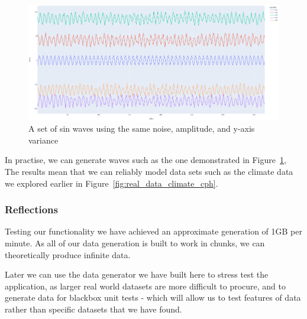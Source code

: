 \begin{figure}[H]
    \centering
    \includegraphics[width=12cm]{figures/data_generation/fake_data_sin_waves}
    \caption{A set of sin waves using the same noise, amplitude, and y-axis variance}
    \label{fig:datagen_fig_3}
\end{figure}

In practise, we can generate waves such as the one demonstrated in Figure~\ref{fig:datagen_fig_3}, The results mean that
we can reliably model data sets such as the climate data we explored earlier in Figure~\ref{fig:real_data_climate_cph}.

\subsubsection{Reflections}

Testing our functionality we have achieved an approximate generation of 1GB per minute.
As all of our data generation is built to work in chunks, we can theoretically produce infinite data.

Later we can use the data generator we have built here to stress test the application, as larger real world datasets are
more difficult to procure, and to generate data for blackbox unit tests - which will allow us to test features of data
rather than specific datasets that we have found.
